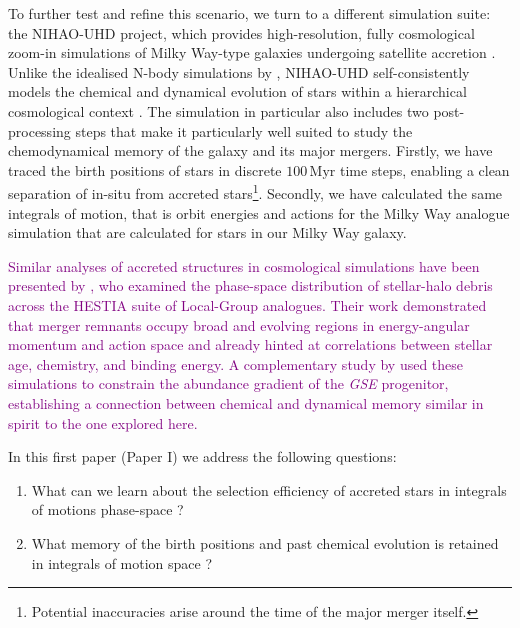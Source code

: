 \documentclass[fleqn,usenatbib]{mnras}
\newcommand{\changed}[1]{{\textcolor{purple}{#1}}}
\begin{document}
To further test and refine this scenario, we turn to a different simulation suite: the NIHAO-UHD project, which provides high-resolution, fully cosmological zoom-in simulations of Milky Way-type galaxies undergoing satellite accretion \citep{Buck2020, Buck2020b, Buck2021}. Unlike the idealised N-body simulations by \citet{Mori2024}, NIHAO-UHD self-consistently models the chemical and dynamical evolution of stars within a hierarchical cosmological context \citep{Buck2021}. 
The simulation in particular also includes two post-processing steps that make it particularly well suited to study the chemodynamical memory of the galaxy and its major mergers. Firstly, we have traced the birth positions of stars in discrete $100\,\mathrm{Myr}$ time steps, enabling a clean separation of in-situ from accreted stars\footnote{Potential inaccuracies arise around the time of the major merger itself.}. Secondly, we have calculated the same integrals of motion, that is orbit energies and actions for the Milky Way analogue simulation that are calculated for stars in our Milky Way galaxy.

\changed{Similar analyses of accreted structures in cosmological simulations have been presented by \citet{Khoperskov2023d,Khoperskov2023b}, who examined the phase-space distribution of stellar-halo debris across the HESTIA suite of Local-Group analogues. Their work demonstrated that merger remnants occupy broad and evolving regions in energy-angular momentum and action space and already hinted at correlations between stellar age, chemistry, and binding energy. A complementary study by \citet{Khoperskov2023c} used these simulations to constrain the abundance gradient of the \textit{GSE} progenitor, establishing a connection between chemical and dynamical memory similar in spirit to the one explored here.}

In this first paper (Paper I) we address the following questions: 
\begin{enumerate}[leftmargin=2em,labelwidth=0em]
    \item What can we learn about the selection efficiency of accreted stars in integrals of motions phase-space \citep{Helmi2018, Feuillet2021, Buder2022, Monty2024}?
    \item What memory of the birth positions and past chemical evolution is retained in integrals of motion space \citep{Skuladottir2025}?
\end{enumerate}
\end{document}
